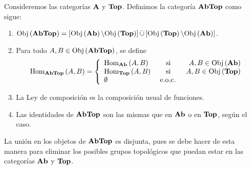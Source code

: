 \documentclass[12pt]{report}
\theoremstyle{largebreak}
\newcommand{\Obj}[1]{\ensuremath{\textup{Obj}\left(#1\right)}}
\newcommand{\Hom}[3]{\ensuremath{\textup{Hom}_{#1}\left(#2,#3\right)}}
\newcommand{\Cat}[1]{\ensuremath{\textup{\textbf{#1}}}}
\begin{document}
    \begin{exa}
        Consideremos las categorías $\Cat{A}$ y $\Cat{Top}$. Definimos la categoría $\Cat{AbTop}$ como sigue:
        \begin{enumerate}
            \item $\Obj{\Cat{AbTop}}=\left[\Obj{\Cat{Ab}}\backslash\Obj{\Cat{Top}}\right]\dot{\cup}\left[\Obj{\Cat{Top}}\backslash\Obj{\Cat{Ab}}\right]$.
            \item Para todo $A,B\in\Obj{\Cat{AbTop}}$, se define
            \begin{equation*}
                \Hom{\Cat{AbTop}}{A}{B}=\left\{
                    \begin{array}{lcr}
                       \Hom{\Cat{Ab}}{A}{B} & \textup{ si } & A,B\in\Obj{\Cat{Ab}}\\
                       \Hom{\Cat{Top}}{A}{B} & \textup{ si } & A,B\in\Obj{\Cat{Top}}\\
                       \emptyset & \textup{ e.o.c. } &  \\
                    \end{array}
                \right.
            \end{equation*}
            \item La Ley de composición es la composición usual de funciones.
            \item Las identidades de $\Cat{AbTop}$ son las mismas que en $\Cat{Ab}$ o en $\Cat{Top}$, según el caso.
        \end{enumerate}
    \end{exa}

    \begin{obs}
        La unión en los objetos de $\Cat{AbTop}$ es disjunta, pues se debe hacer de esta manera para eliminar los posibles grupos topológicos que puedan estar en las categorías $\Cat{Ab}$ y $\Cat{Top}$.
    \end{obs}
\end{document}

